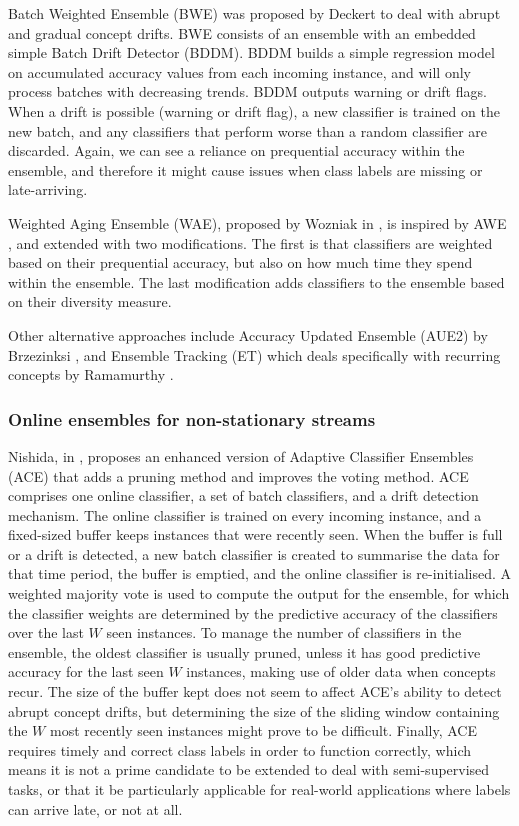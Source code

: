 Batch Weighted Ensemble (BWE) was proposed by Deckert \cite{deckert2011batch} to deal with abrupt and gradual concept drifts. BWE consists of an ensemble with an embedded simple Batch Drift Detector (BDDM). BDDM builds a simple regression model on accumulated accuracy values from each incoming instance, and will only process batches with decreasing trends. BDDM outputs warning or drift flags. When a drift is possible (warning or drift flag), a new classifier is trained on the new batch, and any classifiers that perform worse than a random classifier are discarded. Again, we can see a reliance on prequential accuracy within the ensemble, and therefore it might cause issues when class labels are missing or late-arriving.

Weighted Aging Ensemble (WAE), proposed by Wozniak in \cite{wozniak2013application}, is inspired by AWE \cite{wang2003mining}, and extended with two modifications. The first is that classifiers are weighted based on their prequential accuracy, but also on how much time they spend within the ensemble. The last modification adds classifiers to the ensemble based on their diversity measure.

Other alternative approaches include Accuracy Updated Ensemble (AUE2) by Brzezinksi \cite{brzezinski2014reacting}, and Ensemble Tracking (ET) which deals specifically with recurring concepts by Ramamurthy \cite{ramamurthy2007tracking}.

\subsubsection{Online ensembles for non-stationary streams}

Nishida, in \cite{nishida2007adaptive}, proposes an enhanced version of Adaptive Classifier Ensembles (ACE) that adds a pruning method and improves the voting method. ACE comprises one online classifier, a set of batch classifiers, and a drift detection mechanism. The online classifier is trained on every incoming instance, and a fixed-sized buffer keeps instances that were recently seen. When the buffer is full or a drift is detected, a new batch classifier is created to summarise the data for that time period, the buffer is emptied, and the online classifier is re-initialised. A weighted majority vote is used to compute the output for the ensemble, for which the classifier weights are determined by the predictive accuracy of the classifiers over the last $W$ seen instances. To manage the number of classifiers in the ensemble, the oldest classifier is usually pruned, unless it has good predictive accuracy for the last seen $W$ instances, making use of older data when concepts recur. The size of the buffer kept does not seem to affect ACE's ability to detect abrupt concept drifts, but determining the size of the sliding window containing the $W$ most recently seen instances might prove to be difficult.
Finally, ACE requires timely and correct class labels in order to function correctly, which means it is not a prime candidate to be extended to deal with semi-supervised tasks, or that it be particularly applicable for real-world applications where labels can arrive late, or not at all.

